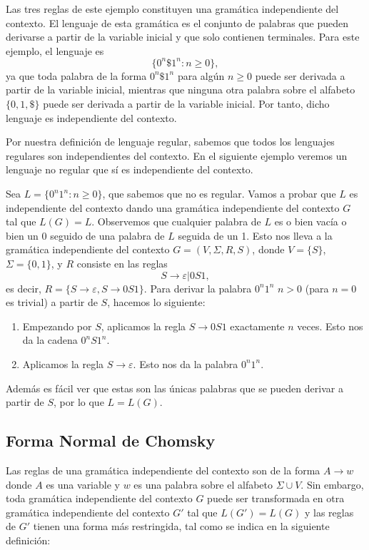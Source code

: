 \documentclass[twoside]{article}
\begin{document}
\begin{ej}
Las tres reglas de este ejemplo constituyen una gramática independiente del contexto. El lenguaje de esta gramática es el conjunto de palabras que pueden derivarse a partir de la variable inicial y que solo contienen terminales. Para este ejemplo, el lenguaje es
$$\{0^n\$ 1^n: n\geq 0\},$$
ya que toda palabra de la forma $0^n\$ 1^n$ para algún $n\geq 0$ puede ser derivada a partir de la variable inicial, mientras que ninguna otra palabra sobre el alfabeto $\{0,1,\$\}$ puede ser derivada a partir de la variable inicial. Por tanto, dicho lenguaje es independiente del contexto.
\end{ej}

Por nuestra definición de lenguaje regular, sabemos que todos los lenguajes regulares son independientes del contexto. En el siguiente ejemplo veremos un lenguaje no regular que sí es independiente del contexto. 

\begin{ej}
Sea $L=\{0^n1^n: n\geq 0\}$, que sabemos que no es regular. Vamos a probar que $L$ es independiente del contexto dando una gramática independiente del contexto $G$ tal que $L(G)=L$. Observemos que cualquier palabra de $L$ es o bien vacía o bien un 0 seguido de una palabra de $L$ seguida de un 1. Esto nos lleva a la gramática independiente del contexto $G=(V,\Sigma,R,S)$, donde $V=\{S\}$, $\Sigma=\{0,1\}$, y $R$ consiste en las reglas
$$S\to\varepsilon|0S1,$$
es decir, $R=\{S\to\varepsilon, S\to 0S1\}$. Para derivar la palabra $0^n1^n$ $n>0$ (para $n=0$ es trivial) a partir de $S$, hacemos lo siguiente:
\begin{enumerate}
\item Empezando por $S$, aplicamos la regla $S\to 0S1$ exactamente $n$ veces. Esto nos da la cadena $0^nS1^n$.
\item Aplicamos la regla $S\to\varepsilon$. Esto nos da la palabra $0^n1^n$. 
\end{enumerate}
Además es fácil ver que estas son las únicas palabras que se pueden derivar a partir de $S$, por lo que $L=L(G)$.
\end{ej}

\subsection{Forma Normal de Chomsky}
Las reglas de una gramática independiente del contexto son de la forma $A\to w$ donde $A$ es una variable y $w$ es una palabra sobre el alfabeto $\Sigma\cup V$. Sin embargo, toda gramática independiente del contexto $G$ puede ser transformada en otra gramática independiente del contexto $G'$ tal que $L(G')=L(G)$ y las reglas de $G'$ tienen una forma más restringida, tal como se indica en la siguiente definición:
\end{document}

